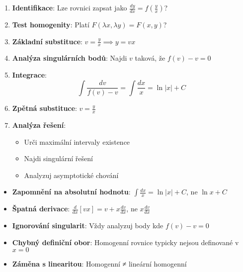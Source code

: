 \begin{method}
\label{met:decision-tree-homogenni}
\begin{enumerate}
\item \textbf{Identifikace}: Lze rovnici zapsat jako $\frac{dy}{dx} = f\left(\frac{y}{x}\right)$?

\item \textbf{Test homogenity}: Platí $F(\lambda x, \lambda y) = F(x, y)$?

\item \textbf{Základní substituce}: $v = \frac{y}{x} \implies y = vx$

\item \textbf{Analýza singulárních bodů}: Najdi $v$ taková, že $f(v) - v = 0$

\item \textbf{Integrace}:
\[
\int \frac{dv}{f(v) - v} = \int \frac{dx}{x} = \ln|x| + C
\]

\item \textbf{Zpětná substituce}: $v = \frac{y}{x}$

\item \textbf{Analýza řešení}:
\begin{itemize}
\item Urči maximální intervaly existence
\item Najdi singulární řešení
\item Analyzuj asymptotické chování
\end{itemize}
\end{enumerate}
\end{method}

\vspace{0.8\baselineskip}

\begin{remark}
\begin{itemize}
\item \textbf{Zapomnění na absolutní hodnotu}: $\int \frac{dx}{x} = \ln|x| + C$, ne $\ln x + C$
\item \textbf{Špatná derivace}: $\frac{d}{dx}[vx] = v + x\frac{dv}{dx}$, ne $x\frac{dv}{dx}$
\item \textbf{Ignorování singularit}: Vždy analyzuj body kde $f(v) - v = 0$
\item \textbf{Chybný definiční obor}: Homogenní rovnice typicky nejsou definované v $x = 0$
\item \textbf{Záměna s linearitou}: Homogenní ≠ lineární homogenní
\end{itemize}
\end{remark}

